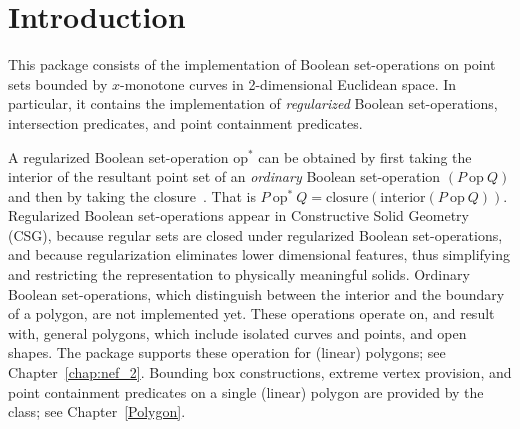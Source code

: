 \newcommand{\reals}{{\rm I\!\hspace{-0.025em} R}}
\newcommand{\calC}{{\cal C}}
\newcommand{\calA}{{\cal A}}
\newcommand{\eps}{{\varepsilon}}
\newcommand{\dcel}{{\sc Dcel}}
\newcommand{\naive}{na\"{\i}ve}
\newcommand{\kdtree}{{\sc Kd}-tree}

\section{Introduction}
\label{bobs_sec:intro}
%
This package consists of the implementation of Boolean set-operations
on point sets bounded by $x$-monotone curves in 2-dimensional
Euclidean space. In particular, it contains the implementation of
{\em regularized} Boolean set-operations, intersection predicates, and
point containment predicates.

A regularized Boolean set-operation $\mbox{op}^*$ can be obtained by
first taking the interior of the resultant point set of an {\em ordinary}
Boolean set-operation $(P\ \mbox{op}\ Q)$ and then by taking the
closure~\cite{cgal:h-sm-04}. That is
$P\ \mbox{op}^*\ Q = \mbox{closure}(\mbox{interior} (P\ \mbox{op}\ Q))$.
Regularized Boolean set-operations appear in Constructive Solid
Geometry (CSG), because regular sets are closed under regularized
Boolean set-operations, and because regularization eliminates lower
dimensional features, thus simplifying and restricting the
representation to physically meaningful solids.
Ordinary Boolean set-operations, which distinguish between the
interior and the boundary of a polygon, are not implemented yet. These
operations operate on, and result with, general polygons, which
include isolated curves and points, and open shapes. The 
package supports these operation for (linear) polygons; see
Chapter~\ref{chap:nef_2}. Bounding box constructions, extreme vertex
provision, and point containment predicates on a single (linear)
polygon are provided by the  class; see
Chapter~\ref{Polygon}.

